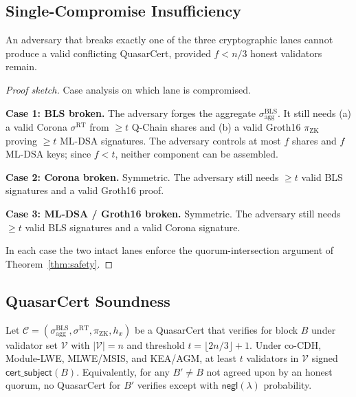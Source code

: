 \subsection{Single-Compromise Insufficiency}

\begin{theorem}
\label{thm:single}
An adversary that breaks exactly one of the three cryptographic lanes
cannot produce a valid conflicting QuasarCert, provided $f < n/3$
honest validators remain.
\end{theorem}

\begin{proof}[Proof sketch]
Case analysis on which lane is compromised.

\textbf{Case 1: BLS broken.} The adversary forges the aggregate
$\sigma^{\mathrm{BLS}}_{\mathrm{agg}}$. It still needs (a) a valid
Corona $\sigma^{\mathrm{RT}}$ from $\geq t$ Q-Chain shares and (b) a
valid Groth16 $\pi_{\mathrm{ZK}}$ proving $\geq t$ ML-DSA signatures.
The adversary controls at most $f$ shares and $f$ ML-DSA keys; since
$f < t$, neither component can be assembled.

\textbf{Case 2: Corona broken.} Symmetric. The adversary still needs
$\geq t$ valid BLS signatures and a valid Groth16 proof.

\textbf{Case 3: ML-DSA / Groth16 broken.} Symmetric. The adversary still
needs $\geq t$ valid BLS signatures and a valid Corona signature.

In each case the two intact lanes enforce the quorum-intersection
argument of Theorem~\ref{thm:safety}.
\end{proof}

\subsection{QuasarCert Soundness}

\begin{theorem}
\label{thm:qcert-sound}
Let $\mathcal{C} = (\sigma^{\mathrm{BLS}}_{\mathrm{agg}},
\sigma^{\mathrm{RT}}, \pi_{\mathrm{ZK}}, h_x)$ be a QuasarCert that
verifies for block $B$ under validator set $\mathcal{V}$ with $|\mathcal{V}|
= n$ and threshold $t = \lfloor 2n/3 \rfloor + 1$. Under co-CDH,
Module-LWE, MLWE/MSIS, and KEA/AGM, at least $t$ validators in
$\mathcal{V}$ signed $\mathsf{cert\_subject}(B)$. Equivalently, for any
$B' \neq B$ not agreed upon by an honest quorum, no QuasarCert for $B'$
verifies except with $\mathsf{negl}(\lambda)$ probability.
\end{theorem}

